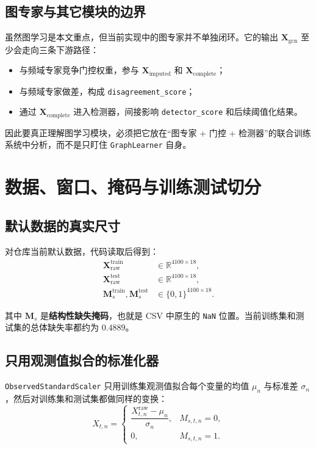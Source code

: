\documentclass[UTF8]{ctexart}
\begin{document}
\subsection{图专家与其它模块的边界}

虽然图学习是本文重点，但当前实现中的图专家并不单独闭环。它的输出 \(\bm{X}_{\text{gcn}}\) 至少会走向三条下游路径：
\begin{itemize}
    \item 与频域专家竞争门控权重，参与 \(\bm{X}_{\text{imputed}}\) 和 \(\bm{X}_{\text{complete}}\)；
    \item 与频域专家做差，构成 \texttt{disagreement\_score}；
    \item 通过 \(\bm{X}_{\text{complete}}\) 进入检测器，间接影响 \texttt{detector\_score} 和后续阈值化结果。
\end{itemize}

因此要真正理解图学习模块，必须把它放在“图专家 + 门控 + 检测器”的联合训练系统中分析，而不是只盯住 \texttt{GraphLearner} 自身。

\section{数据、窗口、掩码与训练测试切分}

\subsection{默认数据的真实尺寸}

对仓库当前默认数据，代码读取后得到：
\begin{align}
    \bm{X}^{\text{train}}_{\text{raw}} &\in \mathbb{R}^{4100 \times 18}, \\
    \bm{X}^{\text{test}}_{\text{raw}} &\in \mathbb{R}^{4100 \times 18}, \\
    \bm{M}^{\text{train}}_{s},\bm{M}^{\text{test}}_{s} &\in \{0,1\}^{4100 \times 18}.
\end{align}

其中 \(\bm{M}_{s}\) 是\textbf{结构性缺失掩码}，也就是 CSV 中原生的 \texttt{NaN} 位置。当前训练集和测试集的总体缺失率都约为 \(0.4889\)。

\subsection{只用观测值拟合的标准化器}

\texttt{ObservedStandardScaler} 只用训练集观测值拟合每个变量的均值 \(\mu_n\) 与标准差 \(\sigma_n\)，然后对训练集和测试集都做同样的变换：
\begin{equation}
    X_{t,n} =
    \begin{cases}
        \dfrac{X^{\text{raw}}_{t,n} - \mu_n}{\sigma_n}, & M_{s,t,n}=0, \\[6pt]
        0, & M_{s,t,n}=1.
    \end{cases}
\end{equation}
\end{document}
